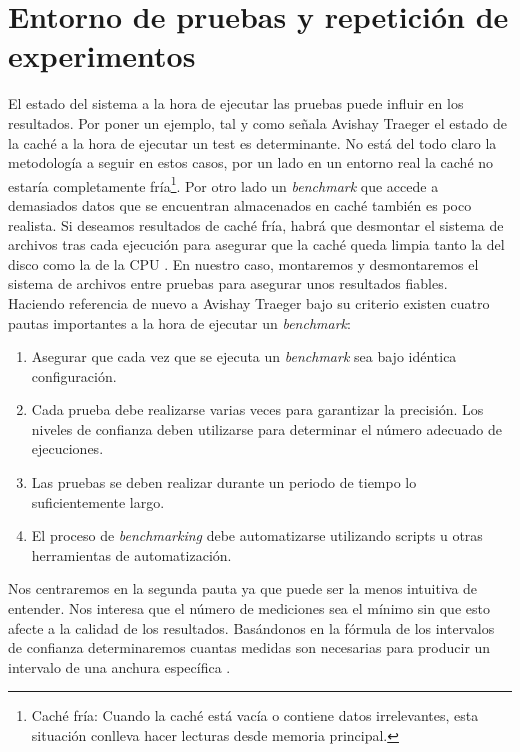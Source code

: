 \section{Entorno de pruebas y repetición de experimentos}
El estado del sistema a la hora de ejecutar las pruebas puede influir en los resultados. Por poner un ejemplo, tal y como señala Avishay Traeger \cite{traeger} el estado de la caché a la hora de ejecutar un test es determinante. No está del todo claro la metodología a seguir en estos casos, por un lado en un entorno real la caché no estaría completamente fría\footnote{Caché fría: Cuando la caché está vacía o contiene datos irrelevantes, esta situación conlleva hacer lecturas desde memoria principal.}. Por otro lado un \textit{benchmark} que accede a demasiados datos que se encuentran almacenados en caché también es poco realista. Si deseamos resultados de caché fría, habrá que desmontar el sistema de archivos tras cada ejecución para asegurar que la caché queda limpia tanto la del disco como la de la CPU \cite{traeger}. En nuestro caso, montaremos y desmontaremos el sistema de archivos entre pruebas para asegurar unos resultados fiables.\\

Haciendo referencia de nuevo a Avishay Traeger bajo su criterio existen cuatro pautas importantes \cite{traeger} a la hora de ejecutar un \textit{benchmark}: 

\begin{enumerate}
    \item Asegurar que cada vez que se ejecuta un \textit{benchmark} sea bajo idéntica configuración.
    \item Cada prueba debe realizarse varias veces para garantizar la precisión. Los niveles de confianza deben utilizarse para determinar el número adecuado de ejecuciones.
    \item Las pruebas se deben realizar durante un periodo de tiempo lo suficientemente largo.
    \item El proceso de \textit{benchmarking} debe automatizarse utilizando scripts u otras herramientas de automatización.
\end{enumerate}

Nos centraremos en la segunda pauta ya que puede ser la menos intuitiva de entender. Nos interesa que el número de mediciones sea el mínimo sin que esto afecte a la calidad de los resultados. Basándonos en la fórmula de los intervalos de confianza determinaremos cuantas medidas son necesarias para producir un intervalo de una anchura específica \cite{lilja_2000}. \\

